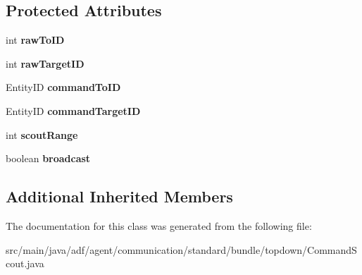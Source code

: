 \subsection*{Protected Attributes}
\begin{DoxyCompactItemize}
\item 
\hypertarget{classadf_1_1agent_1_1communication_1_1standard_1_1bundle_1_1topdown_1_1CommandScout_ab9f6f14233089a3c4c7e45aca38b0f3b}{}\label{classadf_1_1agent_1_1communication_1_1standard_1_1bundle_1_1topdown_1_1CommandScout_ab9f6f14233089a3c4c7e45aca38b0f3b} 
int {\bfseries raw\+To\+ID}
\item 
\hypertarget{classadf_1_1agent_1_1communication_1_1standard_1_1bundle_1_1topdown_1_1CommandScout_a43c3f3f5bf3e911544bee44b0e8af9d9}{}\label{classadf_1_1agent_1_1communication_1_1standard_1_1bundle_1_1topdown_1_1CommandScout_a43c3f3f5bf3e911544bee44b0e8af9d9} 
int {\bfseries raw\+Target\+ID}
\item 
\hypertarget{classadf_1_1agent_1_1communication_1_1standard_1_1bundle_1_1topdown_1_1CommandScout_acb3965fde0c0075ac3aa7d6d8e0de822}{}\label{classadf_1_1agent_1_1communication_1_1standard_1_1bundle_1_1topdown_1_1CommandScout_acb3965fde0c0075ac3aa7d6d8e0de822} 
Entity\+ID {\bfseries command\+To\+ID}
\item 
\hypertarget{classadf_1_1agent_1_1communication_1_1standard_1_1bundle_1_1topdown_1_1CommandScout_a41a75bf501fa6609537fbd04c7492b6a}{}\label{classadf_1_1agent_1_1communication_1_1standard_1_1bundle_1_1topdown_1_1CommandScout_a41a75bf501fa6609537fbd04c7492b6a} 
Entity\+ID {\bfseries command\+Target\+ID}
\item 
\hypertarget{classadf_1_1agent_1_1communication_1_1standard_1_1bundle_1_1topdown_1_1CommandScout_a136aa5156dbb9af4a8b84ca717223fca}{}\label{classadf_1_1agent_1_1communication_1_1standard_1_1bundle_1_1topdown_1_1CommandScout_a136aa5156dbb9af4a8b84ca717223fca} 
int {\bfseries scout\+Range}
\item 
\hypertarget{classadf_1_1agent_1_1communication_1_1standard_1_1bundle_1_1topdown_1_1CommandScout_a8bdefe70df15b11d6cf11dce0d752e51}{}\label{classadf_1_1agent_1_1communication_1_1standard_1_1bundle_1_1topdown_1_1CommandScout_a8bdefe70df15b11d6cf11dce0d752e51} 
boolean {\bfseries broadcast}
\end{DoxyCompactItemize}
\subsection*{Additional Inherited Members}


The documentation for this class was generated from the following file\+:\begin{DoxyCompactItemize}
\item 
src/main/java/adf/agent/communication/standard/bundle/topdown/Command\+Scout.\+java\end{DoxyCompactItemize}
